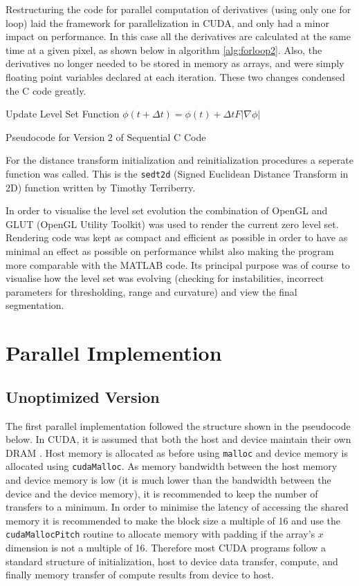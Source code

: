 Restructuring the code for parallel computation of derivatives (using only one for loop) laid the framework for parallelization in CUDA, and only had a minor impact on performance. In this case all the derivatives are calculated at the same time at a given pixel, as shown below in algorithm \ref{alg:forloop2}. Also, the derivatives no longer needed to be stored in memory as arrays, and were simply floating point variables declared at each iteration. These two changes condensed the C code greatly.


\begin{algorithm}[h]
\BlankLine
\dontprintsemicolon
{}
\BlankLine
Update Level Set Function $\phi(t+\Delta t) =\phi(t) + \Delta t F|\nabla\phi|$\;
\caption{Pseudocode for Version 2 of Sequential C Code}\label{alg:forloop2}
\end{algorithm}

For the distance transform initialization and reinitialization procedures a seperate function was called. This is the \texttt{sedt2d} (Signed Euclidean Distance Transform in 2D) function written by Timothy Terriberry.

In order to visualise the level set evolution the combination of OpenGL and GLUT (OpenGL Utility Toolkit) was used to render the current zero level set. Rendering code was kept as compact and efficient as possible in order to have as minimal an effect as possible on performance whilst also making the program more comparable with the MATLAB code. Its principal purpose was of course to visualise how the level set was evolving (checking for instabilities, incorrect parameters for thresholding, range and curvature) and view the final segmentation. 

\section{Parallel Implemention}
	\subsection{Unoptimized Version}
The first parallel implementation followed the structure shown in the pseudocode below. In CUDA, it is assumed that both the host and device maintain their own DRAM \cite{cuda}. Host memory is allocated as before using \texttt{malloc} and device memory is allocated using \texttt{cudaMalloc}. As memory bandwidth between the host memory and device memory is low (it is much lower than the bandwidth between the device and the device memory), it is recommended to keep the number of transfers to a minimum. In order to minimise the latency of accessing the shared memory it is recommended to make the block size a multiple of 16 and use the \texttt{cudaMallocPitch} routine to allocate memory with padding if the array's $x$ dimension is not a multiple of 16. Therefore most CUDA programs follow a standard structure of initialization, host to device data transfer, compute, and finally memory transfer of compute results from device to host. 

